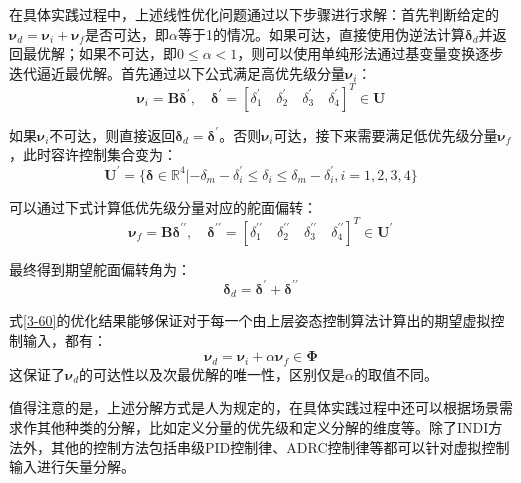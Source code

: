 在具体实践过程中，上述线性优化问题通过以下步骤进行求解：首先判断给定的$\boldsymbol{\nu}_d=\boldsymbol{\nu}_i+\boldsymbol{\nu}_f$是否可达，即$\alpha$等于1的情况。如果可达，直接使用伪逆法计算$\boldsymbol{\delta}_d$并返回最优解；如果不可达，即$0\leqslant\alpha<1$，则可以使用单纯形法通过基变量变换逐步迭代逼近最优解。首先通过以下公式满足高优先级分量$\boldsymbol{\nu}_i$：
\begin{equation}
    \boldsymbol{\nu}_i=\boldsymbol{B}\boldsymbol{\delta}^\prime,\quad\boldsymbol{\delta}^\prime=[\delta_{1}^\prime\quad\delta_{2}^\prime\quad\delta_{3}^\prime\quad\delta_{4}^\prime]^T\in\boldsymbol{U}
    \label{3-61}
\end{equation}

如果$\boldsymbol{\nu}_i$不可达，则直接返回$\boldsymbol{\delta}_d=\boldsymbol{\delta}^\prime$。否则$\boldsymbol{\nu}_i$可达，接下来需要满足低优先级分量$\boldsymbol{\nu}_f$，此时容许控制集合变为：
\begin{equation}
    \boldsymbol{U}^\prime=\{\boldsymbol{\delta}\in\mathbb{R}^4|-\delta_m-\delta_{i}^\prime\leq\delta_i\leq\delta_m-\delta_{i}^\prime,i=1,2,3,4\}
    \label{3-62}
\end{equation}

可以通过下式计算低优先级分量对应的舵面偏转：
\begin{equation}
    \boldsymbol{\nu}_f=\boldsymbol{B}\boldsymbol{\delta}^{\prime\prime},\quad\boldsymbol{\delta}^{\prime\prime}=[\delta_{1}^{\prime\prime}\quad\delta_{2}^{\prime\prime}\quad\delta_{3}^{\prime\prime}\quad\delta_{4}^{\prime\prime}]^T\in\boldsymbol{U}^{\prime}
    \label{3-63}
\end{equation}

最终得到期望舵面偏转角为：
\begin{equation}
    \boldsymbol{\delta}_d = \boldsymbol{\delta}^{\prime}+\boldsymbol{\delta}^{\prime\prime}
    \label{3-64}
\end{equation}

式\eqref{3-60}的优化结果能够保证对于每一个由上层姿态控制算法计算出的期望虚拟控制输入，都有：
\begin{equation}
    \boldsymbol{\nu}_d=\boldsymbol{\nu}_i+\alpha\boldsymbol{\nu}_f\in \boldsymbol{\Phi}
\label{3-65}
\end{equation}
这保证了$\boldsymbol{\nu}_d$的可达性以及次最优解的唯一性，区别仅是$\alpha$的取值不同。

值得注意的是，上述分解方式是人为规定的，在具体实践过程中还可以根据场景需求作其他种类的分解，比如定义分量的优先级和定义分解的维度等。除了INDI方法外，其他的控制方法包括串级PID控制律、ADRC控制律\cite{HKXB202010026}等都可以针对虚拟控制输入进行矢量分解。


